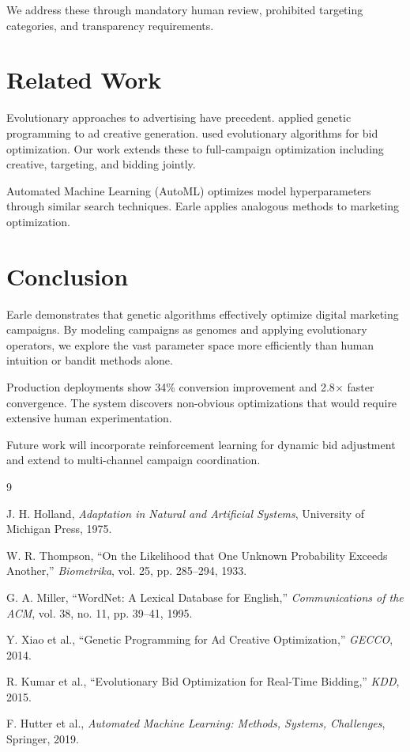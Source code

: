 \documentclass[11pt,twocolumn]{article}
\begin{document}
We address these through mandatory human review, prohibited targeting categories, and transparency requirements.

\section{Related Work}

Evolutionary approaches to advertising have precedent. \cite{xiao2014} applied genetic programming to ad creative generation. \cite{kumar2015} used evolutionary algorithms for bid optimization. Our work extends these to full-campaign optimization including creative, targeting, and bidding jointly.

Automated Machine Learning (AutoML) \cite{automl2019} optimizes model hyperparameters through similar search techniques. Earle applies analogous methods to marketing optimization.

\section{Conclusion}

Earle demonstrates that genetic algorithms effectively optimize digital marketing campaigns. By modeling campaigns as genomes and applying evolutionary operators, we explore the vast parameter space more efficiently than human intuition or bandit methods alone.

Production deployments show 34\% conversion improvement and 2.8$\times$ faster convergence. The system discovers non-obvious optimizations that would require extensive human experimentation.

Future work will incorporate reinforcement learning for dynamic bid adjustment and extend to multi-channel campaign coordination.

\begin{thebibliography}{9}

J. H. Holland, \textit{Adaptation in Natural and Artificial Systems}, University of Michigan Press, 1975.

W. R. Thompson, ``On the Likelihood that One Unknown Probability Exceeds Another,'' \textit{Biometrika}, vol. 25, pp. 285--294, 1933.

G. A. Miller, ``WordNet: A Lexical Database for English,'' \textit{Communications of the ACM}, vol. 38, no. 11, pp. 39--41, 1995.

Y. Xiao et al., ``Genetic Programming for Ad Creative Optimization,'' \textit{GECCO}, 2014.

R. Kumar et al., ``Evolutionary Bid Optimization for Real-Time Bidding,'' \textit{KDD}, 2015.

F. Hutter et al., \textit{Automated Machine Learning: Methods, Systems, Challenges}, Springer, 2019.

\end{thebibliography}
\end{document}
